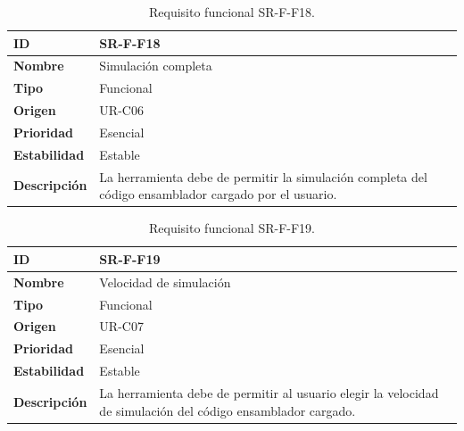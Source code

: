 \begin{center}
\begin{table}[htbp]
\centering
\caption{Requisito funcional SR-F-F18.}
\begin{tabular}{@{}p{2.5cm} p{9cm}@{}} 
\toprule
\textbf{ID} 				& SR-F-F18 \\
\midrule
\textbf{Nombre} 			& Simulación completa\\
\midrule
\textbf{Tipo} 			& Funcional \\
\midrule
\textbf{Origen} 			& UR-C06 \\
\midrule
\textbf{Prioridad}		& Esencial \\
\midrule
\textbf{Estabilidad} 		& Estable \\
\midrule
\textbf{Descripción} 	& La herramienta debe de permitir la simulación completa del código \gls{ensamblador} cargado por el usuario. \\
\bottomrule
\end{tabular}
\label{tab:srff18}
\end{table}
\end{center}

\begin{center}
\begin{table}[htbp]
\centering
\caption{Requisito funcional SR-F-F19.}
\begin{tabular}{@{}p{2.5cm} p{9cm}@{}} 
\toprule
\textbf{ID} 				& SR-F-F19 \\
\midrule
\textbf{Nombre} 			& Velocidad de simulación\\
\midrule
\textbf{Tipo} 			& Funcional \\
\midrule
\textbf{Origen} 			& UR-C07 \\
\midrule
\textbf{Prioridad}		& Esencial \\
\midrule
\textbf{Estabilidad} 		& Estable \\
\midrule
\textbf{Descripción} 	& La herramienta debe de permitir al usuario elegir la velocidad de simulación del código \gls{ensamblador} cargado. \\
\bottomrule
\end{tabular}
\label{tab:srff19}
\end{table}
\end{center}

